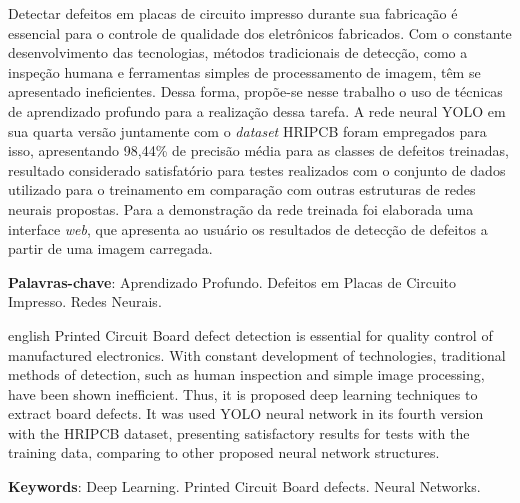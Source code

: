 \documentclass[
	12pt,				%
	openright,			%
	oneside,			%
	a4paper,			%
	chapter=TITLE,		%
	english,			%
	french,				%
	spanish,			%
	brazil				%
	]{abntex2}
\begin{document}
\setlength{\absparsep}{18pt} %
\begin{resumo}
Detectar defeitos em placas de circuito impresso durante sua fabricação é essencial para o controle de qualidade dos eletrônicos fabricados. Com o constante desenvolvimento das tecnologias, métodos tradicionais de detecção, como a inspeção humana e ferramentas simples de processamento de imagem, têm se apresentado ineficientes. Dessa forma, propõe-se nesse trabalho o uso de técnicas de aprendizado profundo para a realização dessa tarefa. A rede neural YOLO em sua quarta versão juntamente com o \textit{dataset} HRIPCB foram empregados para isso, apresentando 98,44\% de precisão média para as classes de defeitos treinadas, resultado considerado satisfatório para testes realizados com o conjunto de dados utilizado para o treinamento em comparação com outras estruturas de redes neurais propostas. Para a demonstração da rede treinada foi elaborada uma interface \textit{web}, que apresenta ao usuário os resultados de detecção de defeitos a partir de uma imagem carregada.

\textbf{Palavras-chave}: Aprendizado Profundo. Defeitos em Placas de Circuito Impresso. Redes Neurais.
\end{resumo}

\begin{resumo}[Abstract]
 \begin{otherlanguage*}{english}
    Printed Circuit Board defect detection is essential for quality control of manufactured electronics. With constant development of technologies, traditional methods of detection, such as human inspection and simple image processing, have been shown inefficient. Thus, it is proposed deep learning techniques to extract board defects. It was used YOLO neural network in its fourth version with the HRIPCB dataset, presenting satisfactory results for tests with the training data, comparing to other proposed neural network structures.

   \vspace{\onelineskip}

   \noindent
   \textbf{Keywords}: Deep Learning. Printed Circuit Board defects. Neural Networks.
 \end{otherlanguage*}
\end{resumo}
\end{document}
